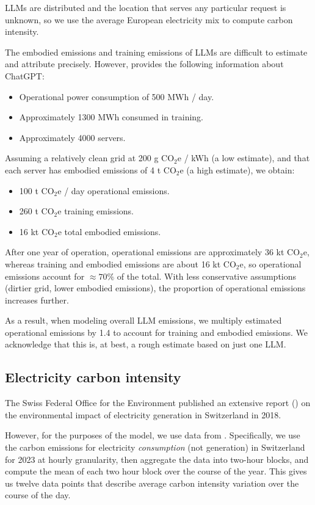 \documentclass[11pt]{article}
\begin{document}
LLMs are distributed and the location that serves any particular request is unknown, so we use the
average European electricity mix to compute carbon intensity.

The embodied emissions and training emissions of LLMs are difficult to estimate and attribute precisely.
However, \textcite{devries2023growing} provides the following information about ChatGPT:
\begin{itemize}
    \item Operational power consumption of 500 MWh / day.
    \item Approximately 1300 MWh consumed in training.
    \item Approximately 4000 servers.
\end{itemize}

Assuming a relatively clean grid at 200 g CO$_2$e / kWh (a low estimate), and that each server has embodied emissions of 4 t CO$_2$e (a high estimate),
we obtain:
\begin{itemize}
    \item 100 t CO$_2$e / day operational emissions.
    \item 260 t CO$_2$e training emissions.
    \item 16 kt CO$_2$e total embodied emissions.
\end{itemize}

After one year of operation, operational emissions are approximately 36 kt CO$_2$e, whereas training and embodied emissions are about 16 kt CO$_2$e,
so operational emissions account for $\approx 70\%$ of the total. With less conservative assumptions (dirtier grid, lower embodied emissions),
the proportion of operational emissions increases further.

As a result, when modeling overall LLM emissions, we multiply estimated operational emissions by 1.4 to account for training and embodied emissions.
We acknowledge that this is, at best, a rough estimate based on just one LLM.

\subsection{Electricity carbon intensity}

The Swiss Federal Office for the Environment published an extensive report (\cite{krebs2018umweltbilanz})
on the environmental impact of electricity generation in Switzerland in 2018.

However, for the purposes of the model, we use data from \textcite{electricitymaps}. Specifically,
we use the carbon emissions for electricity {\em consumption} (not generation) in Switzerland for 2023
at hourly granularity, then aggregate the data into two-hour blocks, and compute the mean of each two
hour block over the course of the year. This gives us twelve data points that describe average
carbon intensity variation over the course of the day.
\end{document}
